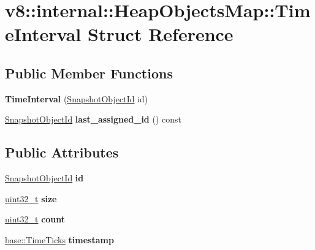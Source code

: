 \hypertarget{structv8_1_1internal_1_1HeapObjectsMap_1_1TimeInterval}{}\section{v8\+:\+:internal\+:\+:Heap\+Objects\+Map\+:\+:Time\+Interval Struct Reference}
\label{structv8_1_1internal_1_1HeapObjectsMap_1_1TimeInterval}
\subsection*{Public Member Functions}
\begin{DoxyCompactItemize}
\item 
\mbox{\label{structv8_1_1internal_1_1HeapObjectsMap_1_1TimeInterval_a034e331cfb6aff3dd752359abe5a8e46}} 
{\bfseries Time\+Interval} (\mbox{\hyperlink{classuint32__t}{Snapshot\+Object\+Id}} id)
\item 
\mbox{\label{structv8_1_1internal_1_1HeapObjectsMap_1_1TimeInterval_a463086586c7fcd326f46643038698395}} 
\mbox{\hyperlink{classuint32__t}{Snapshot\+Object\+Id}} {\bfseries last\+\_\+assigned\+\_\+id} () const
\end{DoxyCompactItemize}
\subsection*{Public Attributes}
\begin{DoxyCompactItemize}
\item 
\mbox{\label{structv8_1_1internal_1_1HeapObjectsMap_1_1TimeInterval_a72584d484e3384ca69a31b7365196a56}} 
\mbox{\hyperlink{classuint32__t}{Snapshot\+Object\+Id}} {\bfseries id}
\item 
\mbox{\label{structv8_1_1internal_1_1HeapObjectsMap_1_1TimeInterval_a5a42f1b26719a226735a9751d51cf90c}} 
\mbox{\hyperlink{classuint32__t}{uint32\+\_\+t}} {\bfseries size}
\item 
\mbox{\label{structv8_1_1internal_1_1HeapObjectsMap_1_1TimeInterval_a4c483a95cfdec144e1a9aef2a3754753}} 
\mbox{\hyperlink{classuint32__t}{uint32\+\_\+t}} {\bfseries count}
\item 
\mbox{\label{structv8_1_1internal_1_1HeapObjectsMap_1_1TimeInterval_a1e63e8711a20ae816b3c6f984fcaeb76}} 
\mbox{\hyperlink{classv8_1_1base_1_1TimeTicks}{base\+::\+Time\+Ticks}} {\bfseries timestamp}
\end{DoxyCompactItemize}


